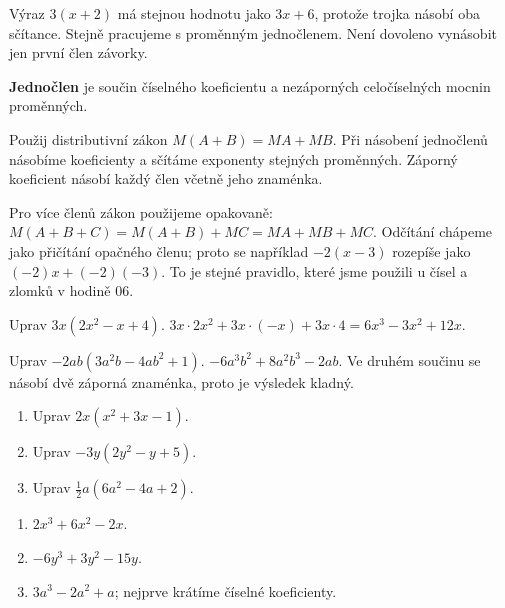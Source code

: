 \documentclass[11pt,a4paper]{article}
\begin{document}

Výraz $3(x+2)$ má stejnou hodnotu jako $3x+6$, protože trojka násobí oba sčítance. Stejně pracujeme s proměnným jednočlenem. Není dovoleno vynásobit jen první člen závorky.

\begin{definiceBox}[title={Připomenutí definice},breakable=false]
\textbf{Jednočlen} je součin číselného koeficientu a nezáporných celočíselných mocnin proměnných.
\end{definiceBox}


Použij distributivní zákon $M(A+B)=MA+MB$. Při násobení jednočlenů násobíme koeficienty a sčítáme exponenty stejných proměnných. Záporný koeficient násobí každý člen včetně jeho znaménka.

Pro více členů zákon použijeme opakovaně:
$M(A+B+C)=M(A+B)+MC=MA+MB+MC$.
Odčítání chápeme jako přičítání opačného členu; proto se
například $-2(x-3)$ rozepíše jako $(-2)x+(-2)(-3)$.
To je stejné pravidlo, které jsme použili u čísel a zlomků v hodině 06.


\begin{prikladReseniBox}[title={Příklad 1},breakable=false]
Uprav $3x(2x^2-x+4)$.
\tcblower
$3x\cdot2x^2+3x\cdot(-x)+3x\cdot4=6x^3-3x^2+12x$.
\end{prikladReseniBox}


\begin{prikladReseniBox}[title={Příklad 2},breakable=false]
Uprav $-2ab(3a^2b-4ab^2+1)$.
\tcblower
$-6a^3b^2+8a^2b^3-2ab$. Ve druhém součinu se násobí dvě záporná znaménka, proto je výsledek kladný.
\end{prikladReseniBox}



\begin{zadaniReseniBox}[title={Procvičení},breakable=false]
\begin{enumerate}[label=\alph*)]
\item Uprav $2x(x^2+3x-1)$.
\item Uprav $-3y(2y^2-y+5)$.
\item Uprav $\frac12a(6a^2-4a+2)$.
\end{enumerate}
\tcblower
\begin{enumerate}[label=\alph*)]
\item $2x^3+6x^2-2x$.
\item $-6y^3+3y^2-15y$.
\item $3a^3-2a^2+a$; nejprve krátíme číselné koeficienty.
\end{enumerate}
\end{zadaniReseniBox}
\end{document}
